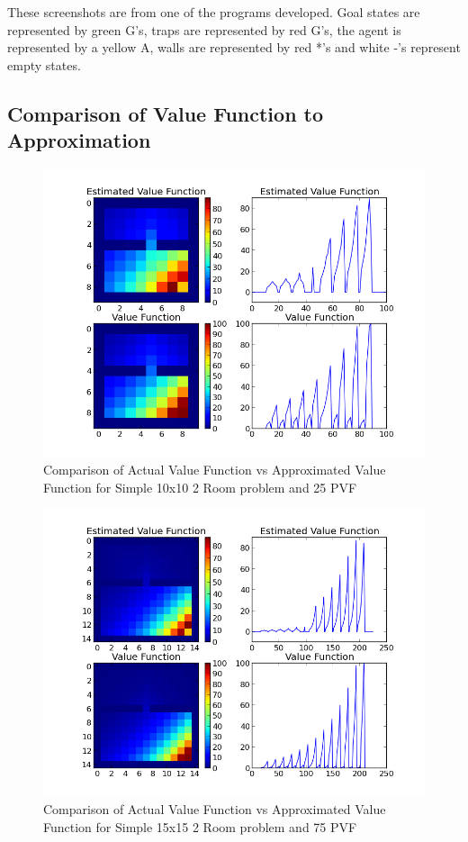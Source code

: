\documentclass[12pt, letterpaper, final]{report}
\begin{document}
These screenshots are from one of the programs developed. Goal states
are represented by green G's, traps are represented by red G's, the
agent is represented by a yellow A, walls are represented by red *'s and
white -'s represent empty states.

\subsection*{Comparison of Value Function to Approximation}

\FloatBarrier
\begin{figure}[h!]
\centering
\includegraphics[scale=.5]{images/paper_example_V_function_comparison_k25_s5000_graph01.png}
\caption{Comparison of Actual Value Function vs Approximated Value
  Function for Simple 10x10 2 Room problem and 25 PVF}
\label{valueVsQ1}
\end{figure}
\FloatBarrier

\FloatBarrier
\begin{figure}[h!]
\centering
\includegraphics[scale=.5]{images/paper_example_big_V_function_comparison_k75_s5000_graph01.png}
\caption{Comparison of Actual Value Function vs Approximated Value
  Function for Simple 15x15 2 Room problem and 75 PVF}
\label{valueVsQ2}
\end{figure}
\FloatBarrier
\end{document}
